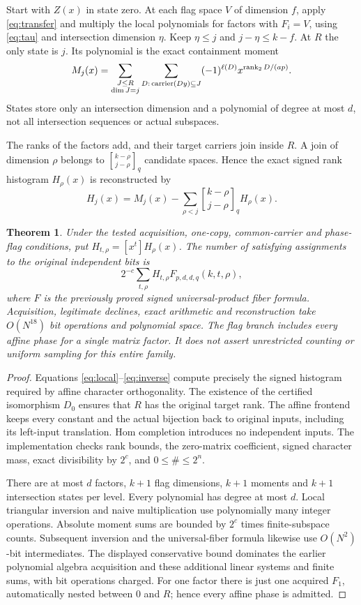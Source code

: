 \documentclass[11pt]{article}
\newtheorem{theorem}{Theorem}\newtheorem{lemma}{Lemma}
\begin{document}
Start with $Z(x)$ in state zero. At each flag space $V$ of dimension $f$,
apply \eqref{eq:transfer} and multiply the local polynomials for factors
with $F_i=V$, using \eqref{eq:tau} and intersection dimension $\eta$.
Keep $\eta\le j$ and $j-\eta\le k-f$. At $R$ the only state is $j$.
Its polynomial is the exact containment moment
\[
 M_j(x)=\sum_{\substack{J\le R\\\dim J=j}}
         \sum_{D:\,\operatorname{carrier}(Dy)\subseteq J}
                    (-1)^{\ell(D)}x^{\operatorname{rank}_2D/(ap)}.
\]
States store only an intersection dimension and a polynomial of degree
at most $d$, not all intersection sequences or actual subspaces.

The ranks of the factors add, and their target carriers join inside $R$.
A join of dimension $\rho$ belongs to
${k-\rho\brack j-\rho}_q$ candidate spaces. Hence the exact signed
rank histogram $H_\rho(x)$ is reconstructed by
\begin{equation}\label{eq:inverse}
 H_j(x)=M_j(x)-\sum_{\rho<j}{k-\rho\brack j-\rho}_q H_\rho(x).
\end{equation}

\begin{theorem}
Under the tested acquisition, one-copy, common-carrier and phase-flag
conditions, put $H_{t,\rho}=[x^t]H_\rho(x)$. The number of satisfying
assignments to the original independent bits is
\[
 \boxed{2^{-c}\sum_{t,\rho}H_{t,\rho}F_{p,d,d,q}(k,t,\rho),}
\]
where $F$ is the previously proved signed universal-product fiber formula.
Acquisition, legitimate declines, exact arithmetic and reconstruction
take $O(N^{18})$ bit operations and polynomial space. The flag branch
includes every affine phase for a single matrix factor. It does not
assert unrestricted counting or uniform sampling for this entire family.
\end{theorem}
\begin{proof}
Equations \eqref{eq:local}--\eqref{eq:inverse} compute precisely the
signed histogram required by affine character orthogonality. The existence
of the certified isomorphism $D_0$ ensures that $R$ has the original
target rank. The affine frontend keeps every constant and the actual
bijection back to original inputs, including its left-input translation.
Hom completion introduces no independent inputs. The implementation
checks rank bounds, the zero-matrix coefficient, signed character mass,
exact divisibility by $2^c$, and $0\le\#\le2^n$.

There are at most $d$ factors, $k+1$ flag dimensions, $k+1$ moments and
$k+1$ intersection states per level. Every polynomial has degree at most
$d$. Local triangular inversion and naive multiplication use polynomially
many integer operations. Absolute moment sums are bounded by $2^c$ times
finite-subspace counts. Subsequent inversion and the universal-fiber
formula likewise use $O(N^2)$-bit intermediates. The displayed conservative
bound dominates the earlier polynomial algebra acquisition and these
additional linear systems and finite sums, with bit operations charged.
For one factor there is just one acquired $F_1$, automatically nested
between $0$ and $R$; hence every affine phase is admitted.
\end{proof}
\end{document}
